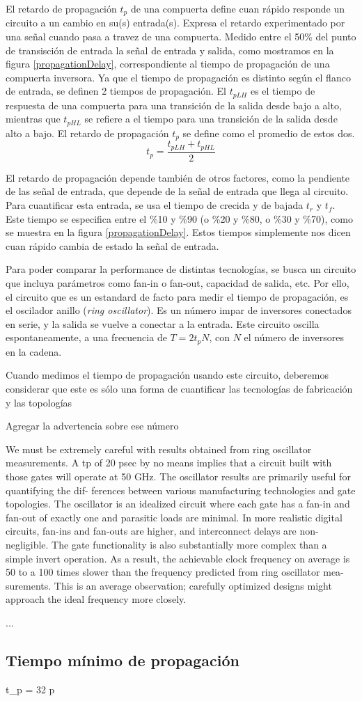 El retardo de propagación $t_p$ de una compuerta define cuan rápido responde un circuito a un cambio en su(s) entrada(s). Expresa el retardo experimentado por una señal cuando pasa a travez de una compuerta. Medido entre el 50\% del punto de transisción de entrada la señal de entrada y salida, como mostramos en la figura \ref{propagationDelay}, correspondiente al tiempo de propagación de una compuerta inversora. Ya que el tiempo de propagación es distinto según el flanco de entrada, se definen 2 tiempos de propagación. El $t_{pLH}$ es el tiempo de respuesta de una compuerta  para una transición de la salida desde bajo a alto, mientras que $t_{pHL}$ se refiere a el tiempo para una transición de la salida desde alto a bajo. El retardo de propagación $t_p$ se define como el promedio de estos dos.
$$ t_p = \frac{t_{pLH} + t_{pHL}}{2} $$

El retardo de propagación depende también de otros factores, como la pendiente de las señal de entrada, que depende de la señal de entrada que llega al circuito. Para cuantificar esta entrada, se usa el tiempo de crecida y de bajada $t_r$ y $t_f$. Este tiempo se especifica entre el \%10 y \%90 (o \%20 y \%80, o \%30 y \%70), como se muestra en la figura \ref{propagationDelay}. Estos tiempos simplemente nos dicen cuan rápido cambia de estado la señal de entrada.

Para poder comparar la performance de distintas tecnologías, se busca un circuito que incluya parámetros como fan-in o fan-out, capacidad de salida, etc. Por ello, el circuito que es un estandard de facto para medir el tiempo de propagación, es el oscilador anillo (\emph{ring oscillator}). Es un número impar de inversores conectados en serie, y la salida se vuelve a conectar a la entrada. Este circuito oscilla espontaneamente, a una frecuencia de $T = 2  t_p  N$, con $N$ el número de inversores en la cadena.

Cuando medimos el tiempo de propagación usando este circuito, deberemos considerar que este es sólo una forma de cuantificar las tecnologías de fabricación y las topologías

Agregar la advertencia sobre ese número

We must be extremely careful with results obtained from ring oscillator
measurements. A tp of 20 psec by no means implies that a circuit built with those gates
will operate at 50 GHz. The oscillator results are primarily useful for quantifying the dif-
ferences between various manufacturing technologies and gate topologies. The oscillator
is an idealized circuit where each gate has a fan-in and fan-out of exactly one and parasitic
loads are minimal. In more realistic digital circuits, fan-ins and fan-outs are higher, and
interconnect delays are non-negligible. The gate functionality is also substantially more
complex than a simple invert operation. As a result, the achievable clock frequency on
average is 50 to a 100 times slower than the frequency predicted from ring oscillator mea-
surements. This is an average observation; carefully optimized designs might approach the
ideal frequency more closely.




...


\subsection{Tiempo mínimo de propagación}
t_p = 32 p



